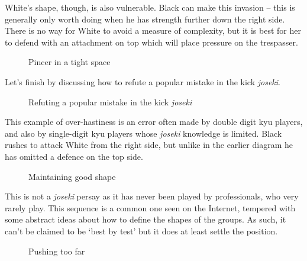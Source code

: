 \documentclass[a5paper,12pt,twoside]{book} %
\newcounter{joseki}                 %
\begin{document}
White's shape, though, is also vulnerable. Black can make this invasion – this is generally only worth doing when he has strength further down the right side. There is no way for White to avoid a measure of complexity, but it is best for her to defend with an attachment on top which will place pressure on the trespasser.\\

\begin{figure}[!htbp]
 
\vspace{-0.6cm}\caption{Pincer in a tight space}
\label{4-4:kick-6}
\end{figure}

Let's finish by discussing how to refute a popular mistake in the kick \textit{joseki}.\\

\begin{figure}[!htbp]
 
\vspace{-0.6cm}\caption{Refuting a popular mistake in the kick \textit{joseki}}
\label{4-4:kick-7}
\end{figure}

This example of over-hastiness is an error often made by double digit kyu players, and also by single-digit kyu players whose \textit{joseki} knowledge is limited. Black rushes to attack White from the right side, but unlike in the earlier diagram he has omitted a defence on the top side.\\
 
\begin{figure}[!htbp]
 
\vspace{-0.6cm}\caption{Maintaining good shape}
\label{4-4:kick-8}
\end{figure} 
 
This is not a \textit{joseki} persay as it has never been played by professionals, who very rarely play{\large\blackstone[4]}. This sequence is a common one seen on the Internet, tempered with some abstract ideas about how to define the shapes of the groups. As such, it can't be claimed to be `best by test' but it does at least settle the position.\\

\begin{figure}[!htbp]
 
\vspace{-0.6cm}\caption{Pushing too far}
\label{4-4:kick-9}
\end{figure} 
\end{document}
